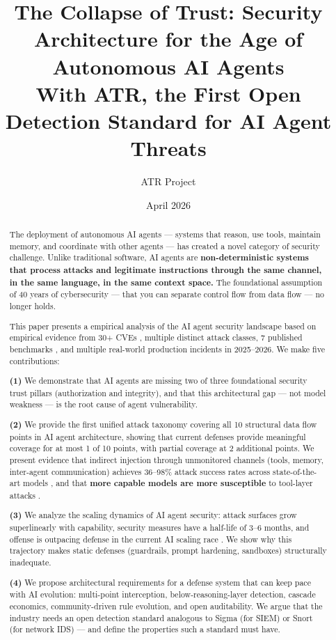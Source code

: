 \documentclass[11pt,letterpaper]{article}
\title{The Collapse of Trust: Security Architecture for the Age of Autonomous AI Agents\\[0.5em]
\large With ATR, the First Open Detection Standard for AI Agent Threats}
\author{ATR Project}
\date{April 2026}
\begin{document}
\maketitle

\begin{abstract}
The deployment of autonomous AI agents --- systems that reason, use tools, maintain memory, and coordinate with other agents --- has created a novel category of security challenge. Unlike traditional software, AI agents are \textbf{non-deterministic systems that process attacks and legitimate instructions through the same channel, in the same language, in the same context space.} The foundational assumption of 40 years of cybersecurity --- that you can separate control flow from data flow --- no longer holds.

This paper presents a empirical analysis of the AI agent security landscape based on empirical evidence from 30+ CVEs \cite{cve6514,cve53773,cvegit,cve49596,cve59536,postmark,sandworm}, multiple distinct attack classes, 7 published benchmarks \cite{pint,mcptox,asb,aishell,hacka,tensortrust,caibench}, and multiple real-world production incidents in 2025--2026. We make five contributions:

\textbf{(1)} We demonstrate that AI agents are missing two of three foundational security trust pillars (authorization and integrity), and that this architectural gap --- not model weakness --- is the root cause of agent vulnerability.

\textbf{(2)} We provide the first unified attack taxonomy covering all 10 structural data flow points in AI agent architecture, showing that current defenses provide meaningful coverage for at most 1 of 10 points, with partial coverage at 2 additional points. We present evidence that indirect injection through unmonitored channels (tools, memory, inter-agent communication) achieves 36--98\% attack success rates across state-of-the-art models \cite{mcptox,minja,asb}, and that \textbf{more capable models are more susceptible} to tool-layer attacks \cite{mcptoxbench}.

\textbf{(3)} We analyze the scaling dynamics of AI agent security: attack surfaces grow superlinearly with capability, security measures have a half-life of 3--6 months, and offense is outpacing defense in the current AI scaling race \cite{aisafety}. We show why this trajectory makes static defenses (guardrails, prompt hardening, sandboxes) structurally inadequate.

\textbf{(4)} We propose architectural requirements for a defense system that can keep pace with AI evolution: multi-point interception, below-reasoning-layer detection, cascade economics, community-driven rule evolution, and open auditability. We argue that the industry needs an open detection standard analogous to Sigma \cite{sigma} (for SIEM) or Snort (for network IDS) --- and define the properties such a standard must have.


\end{abstract}
\end{document}
